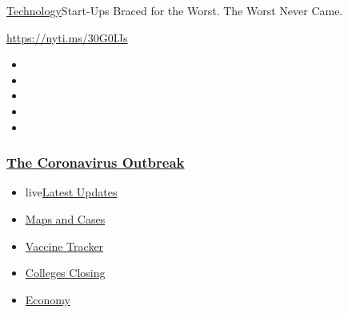 \href{/section/technology}{Technology}\textbar{}Start-Ups Braced for the
Worst. The Worst Never Came.

\url{https://nyti.ms/30G0IJs}

\begin{itemize}
\item
\item
\item
\item
\item
\end{itemize}

\hypertarget{the-coronavirus-outbreak}{%
\subsubsection{\texorpdfstring{\href{https://www.nytimes3xbfgragh.onion/news-event/coronavirus?name=styln-coronavirus-markets\&region=TOP_BANNER\&variant=undefined\&block=storyline_menu_recirc\&action=click\&pgtype=Article\&impression_id=428c5820-e389-11ea-85ce-efb8a1120743}{The
Coronavirus
Outbreak}}{The Coronavirus Outbreak}}\label{the-coronavirus-outbreak}}

\begin{itemize}
\tightlist
\item
  live\href{https://www.nytimes3xbfgragh.onion/2020/08/20/world/coronavirus-covid.html?name=styln-coronavirus-markets\&region=TOP_BANNER\&variant=undefined\&block=storyline_menu_recirc\&action=click\&pgtype=Article\&impression_id=428c5821-e389-11ea-85ce-efb8a1120743}{Latest
  Updates}
\item
  \href{https://www.nytimes3xbfgragh.onion/interactive/2020/us/coronavirus-us-cases.html?name=styln-coronavirus-markets\&region=TOP_BANNER\&variant=undefined\&block=storyline_menu_recirc\&action=click\&pgtype=Article\&impression_id=428c7f30-e389-11ea-85ce-efb8a1120743}{Maps
  and Cases}
\item
  \href{https://www.nytimes3xbfgragh.onion/interactive/2020/science/coronavirus-vaccine-tracker.html?name=styln-coronavirus-markets\&region=TOP_BANNER\&variant=undefined\&block=storyline_menu_recirc\&action=click\&pgtype=Article\&impression_id=428c7f31-e389-11ea-85ce-efb8a1120743}{Vaccine
  Tracker}
\item
  \href{https://www.nytimes3xbfgragh.onion/2020/08/19/us/colleges-closing-covid.html?name=styln-coronavirus-markets\&region=TOP_BANNER\&variant=undefined\&block=storyline_menu_recirc\&action=click\&pgtype=Article\&impression_id=428c7f32-e389-11ea-85ce-efb8a1120743}{Colleges
  Closing}
\item
  \href{https://www.nytimes3xbfgragh.onion/live/2020/08/20/business/stock-market-today-coronavirus?name=styln-coronavirus-markets\&region=TOP_BANNER\&variant=undefined\&block=storyline_menu_recirc\&action=click\&pgtype=Article\&impression_id=428c7f33-e389-11ea-85ce-efb8a1120743}{Economy}
\end{itemize}

